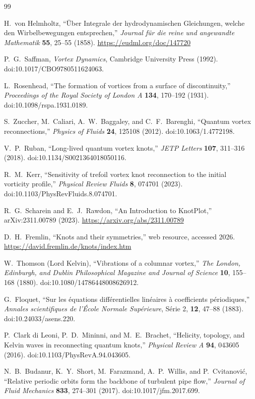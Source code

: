 \begin{thebibliography}{99}

H.~von Helmholtz,
``Über Integrale der hydrodynamischen Gleichungen, welche den Wirbelbewegungen entsprechen,''
\emph{Journal für die reine und angewandte Mathematik} \textbf{55}, 25--55 (1858).
\url{https://eudml.org/doc/147720}

P.~G.~Saffman,
\emph{Vortex Dynamics},
Cambridge University Press (1992).
doi:10.1017/CBO9780511624063.

L.~Rosenhead,
``The formation of vortices from a surface of discontinuity,''
\emph{Proceedings of the Royal Society of London A} \textbf{134}, 170--192 (1931).
doi:10.1098/rspa.1931.0189.

S.~Zuccher, M.~Caliari, A.~W.~Baggaley, and C.~F.~Barenghi,
``Quantum vortex reconnections,''
\emph{Physics of Fluids} \textbf{24}, 125108 (2012).
doi:10.1063/1.4772198.

V.~P.~Ruban,
``Long-lived quantum vortex knots,''
\emph{JETP Letters} \textbf{107}, 311--316 (2018).
doi:10.1134/S0021364018050116.

R.~M.~Kerr,
``Sensitivity of trefoil vortex knot reconnection to the initial vorticity profile,''
\emph{Physical Review Fluids} \textbf{8}, 074701 (2023).
doi:10.1103/PhysRevFluids.8.074701.

R.~G.~Scharein and E.~J.~Rawdon,
``An Introduction to KnotPlot,''
arXiv:2311.00789 (2023).
\url{https://arxiv.org/abs/2311.00789}

D.~H.~Fremlin,
``Knots and their symmetries,''
web resource, accessed 2026.
\url{https://david.fremlin.de/knots/index.htm}


W.~Thomson (Lord Kelvin),
``Vibrations of a columnar vortex,''
\emph{The London, Edinburgh, and Dublin Philosophical Magazine and Journal of Science} \textbf{10}, 155--168 (1880).
doi:10.1080/14786448008626912.

G.~Floquet,
``Sur les équations différentielles linéaires à coefficients périodiques,''
\emph{Annales scientifiques de l'École Normale Supérieure}, Série 2, \textbf{12}, 47--88 (1883).
doi:10.24033/asens.220.

P.~Clark di Leoni, P.~D.~Mininni, and M.~E.~Brachet,
``Helicity, topology, and Kelvin waves in reconnecting quantum knots,''
\emph{Physical Review A} \textbf{94}, 043605 (2016).
doi:10.1103/PhysRevA.94.043605.

N.~B.~Budanur, K.~Y.~Short, M.~Farazmand, A.~P.~Willis, and P.~Cvitanović,
``Relative periodic orbits form the backbone of turbulent pipe flow,''
\emph{Journal of Fluid Mechanics} \textbf{833}, 274--301 (2017).
doi:10.1017/jfm.2017.699.

\end{thebibliography}
